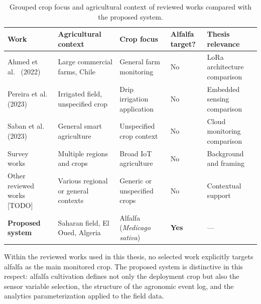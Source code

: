 \begin{table}[H]
  \centering
  \caption{Grouped crop focus and agricultural context of reviewed works compared
           with the proposed system.}
  \label{tab:crop-focus-summary}
  \renewcommand{\arraystretch}{1.3}
  \begin{tabular}{|p{3.5cm}|p{2.8cm}|p{2.8cm}|p{1.5cm}|p{2.0cm}|}
    \hline
    \textbf{Work} & \textbf{Agricultural context} &
    \textbf{Crop focus} & \textbf{Alfalfa target?} & \textbf{Thesis relevance} \\
    \hline
    Ahmed et al.~\cite{ahmed2022lora_agriculture_chile} (2022) &
    Large commercial farms, Chile &
    General farm monitoring &
    No & LoRa architecture comparison \\
    \hline
    Pereira et al.~\cite{pereira2023esp32_drip_irrigation} (2023) &
    Irrigated field, unspecified crop &
    Drip irrigation application &
    No & Embedded sensing comparison \\
    \hline
    Saban et al.~\cite{saban2023smart_agricultural_lora_cloud} (2023) &
    General smart agriculture &
    Unspecified crop context &
    No & Cloud monitoring comparison \\
    \hline
    Survey works~\cite{ayaz2019iot_smart_agriculture_survey,farooq2019iot_smart_agriculture_review} &
    Multiple regions and crops &
    Broad IoT agriculture &
    No & Background and framing \\
    \hline
    Other reviewed works [TODO] &
    Various regional or general contexts &
    Generic or unspecified crops &
    No & Contextual support \\
    \hline
    \textbf{Proposed system} &
    Saharan field, El Oued, Algeria &
    Alfalfa (\textit{Medicago sativa}) &
    \textbf{Yes} & --- \\
    \hline
  \end{tabular}
\end{table}

Within the reviewed works used in this thesis, no selected work explicitly
targets alfalfa as the main monitored crop. The proposed system is distinctive
in this respect: alfalfa cultivation defines not only the deployment crop but
also the sensor variable selection, the structure of the agronomic event log,
and the analytics parameterization applied to the field data.

